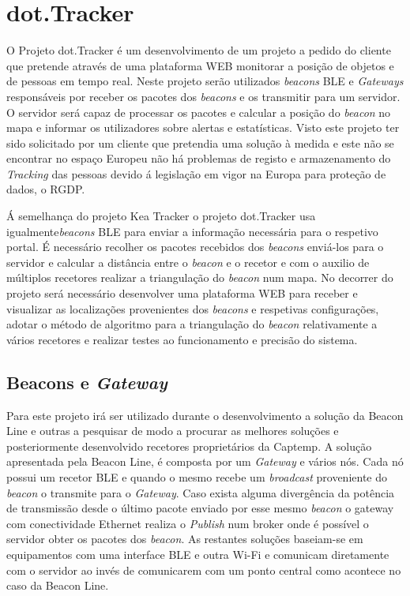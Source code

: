 \section{dot.Tracker} \label{dot.tracker}


\par O Projeto dot.Tracker é um desenvolvimento de um projeto a pedido do cliente que pretende através de uma plataforma WEB monitorar a posição de objetos e de pessoas em tempo real. Neste projeto serão utilizados \textit{beacons} BLE e \textit{Gateways} responsáveis por receber os pacotes dos \textit{beacons} e os transmitir para um servidor. O servidor será capaz de processar os pacotes e calcular a posição do \textit{beacon} no mapa e informar os utilizadores sobre alertas e estatísticas. Visto este projeto ter sido solicitado por um cliente que pretendia uma solução à medida e este não se encontrar no espaço Europeu não há problemas de registo e armazenamento do \textit{Tracking} das pessoas devido á legislação em vigor na Europa para proteção de dados, o RGDP.

Á semelhança do projeto Kea Tracker o projeto dot.Tracker usa igualmente\textit{beacons} BLE para enviar a informação necessária para o respetivo portal. É necessário recolher os pacotes recebidos dos \textit{beacons} enviá-los para o servidor e calcular a distância entre o \textit{beacon} e o recetor e com o auxilio de múltiplos recetores realizar a triangulação do \textit{beacon} num mapa. No decorrer do projeto será necessário desenvolver uma plataforma WEB para receber e visualizar as localizações provenientes dos \textit{beacons} e respetivas configurações, adotar o método de algoritmo para a triangulação do \textit{beacon} relativamente a vários recetores e realizar testes ao funcionamento e precisão do sistema.
\subsection{Beacons e \textit{Gateway}}
Para este projeto irá ser utilizado durante o desenvolvimento a solução da Beacon Line\cite{taskit} e outras a pesquisar de modo a procurar as melhores soluções e posteriormente desenvolvido recetores proprietários da Captemp. A solução apresentada pela Beacon Line, é composta por um \textit{Gateway} e vários nós. Cada nó possui um recetor BLE e quando o mesmo recebe um \textit{broadcast} proveniente do \textit{beacon} o transmite para o \textit{Gateway}. Caso exista alguma divergência da potência de transmissão desde o último pacote enviado por esse mesmo \textit{beacon} o gateway com conectividade Ethernet realiza o \textit{Publish} num broker onde é possível o servidor obter os pacotes dos \textit{beacon}. As restantes soluções baseiam-se em equipamentos com uma interface BLE e outra Wi-Fi e comunicam diretamente com o servidor ao invés de comunicarem com um ponto central como acontece no caso da Beacon Line.


